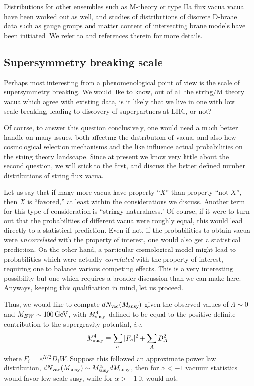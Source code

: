 \documentclass[aps,amsfonts]{ar2e}
\begin{document}
Distributions for other ensembles such as M-theory or type IIa flux
vacua vacua have been worked out as well, and studies of
distributions of discrete D-brane data such as gauge groups and
matter content of intersecting brane models have been initiated. We
refer to \cite{Douglas:2006es} and references therein for more
details.

\subsection{Supersymmetry breaking scale}

\label{sec:susybreaking}

Perhaps most interesting from a phenomenological point of view is the
scale of supersymmetry breaking.  We would like to know, out of all the
string/M theory vacua which agree with existing data, is it likely that
we live in one with low scale breaking, leading to discovery of
superpartners at LHC, or not?

Of course, to answer this question conclusively, one would need a much
better handle on many issues, both affecting the distribution of vacua,
and also how cosmological selection mechanisms and the like influence
actual probabilities on the string theory landscape.  Since at present we
know very little about the second question, we will stick to the first,
and discuss the better defined number distributions of string flux vacua.

Let us say that if many more vacua have property ``$X$'' than property
``not $X$'', then $X$ is ``favored,'' at least within the
considerations we discuss.  Another term for this type of
consideration is ``stringy naturalness.''  Of course, if it were to
turn out that the probabilities of different vacua were roughly equal,
this would lead directly to a statistical prediction.  Even if not, if
the probabilities to obtain vacua were \emph{uncorrelated} with the
property of interest, one would also get a statistical prediction.  On
the other hand, a particular cosmological model might lead to
probabilities which were actually \emph{correlated} with the property
of interest, requiring one to balance various competing effects.  This
is a very interesting possibility but one which requires a broader
discussion than we can make here.  Anyways, keeping this qualification
in mind, let us proceed.

Thus, we would like to compute $dN_{\rm vac}(M_{\rm susy})$ given the
observed values of $\Lambda \sim 0$ and $M_{EW} \sim 100 \, {\rm
GeV}$, with $M_{\rm susy}^4$ defined to be equal to the positive
definite contribution to the supergravity potential, {\it i.e.}
\begin{equation}\label{eq:susyscale}
M_{\rm susy}^4 \equiv \sum_a |F_a|^2 + \sum_A D_A^2
\end{equation}
where $F_i=e^{K/2}D_i W$.
Suppose this followed an approximate power law
distribution, $dN_{\rm vac}(M_{\rm susy})
\sim M_{\rm susy}^\alpha dM_{\rm susy}$, then for $\alpha<-1$ vacuum
statistics would favor low scale susy, while for $\alpha > -1$ it
would not.
\end{document}
